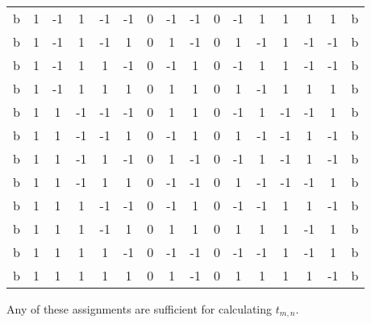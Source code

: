 \documentclass[12pt]{article}
\theoremstyle{plain}
\theoremstyle{definition}
\theoremstyle{remark}
\theoremstyle{definition}
\begin{document}
\begin{center}
\begin{tabular}{|c|c|c|c|c|c|c|c|c|c|c|c|c|c|c|c|}
b & 1 & -1 & 1 & -1 & -1 & 0 & -1 & -1 & 0 & -1 & 1 & 1 & 1 & 1 & b \\
b & 1 & -1 & 1 & -1 & 1 & 0 & 1 & -1 & 0 & 1 & -1 & 1 & -1 & -1 & b \\
b & 1 & -1 & 1 & 1 & -1 & 0 & -1 & 1 & 0 & -1 & 1 & 1 & -1 & -1 & b \\
b & 1 & -1 & 1 & 1 & 1 & 0 & 1 & 1 & 0 & 1 & -1 & 1 & 1 & 1 & b \\
b & 1 & 1 & -1 & -1 & -1 & 0 & 1 & 1 & 0 & -1 & 1 & -1 & -1 & 1 & b \\
b & 1 & 1 & -1 & -1 & 1 & 0 & -1 & 1 & 0 & 1 & -1 & -1 & 1 & -1 & b \\
b & 1 & 1 & -1 & 1 & -1 & 0 & 1 & -1 & 0 & -1 & 1 & -1 & 1 & -1 & b \\
b & 1 & 1 & -1 & 1 & 1 & 0 & -1 & -1 & 0 & 1 & -1 & -1 & -1 & 1 & b \\
b & 1 & 1 & 1 & -1 & -1 & 0 & -1 & 1 & 0 & -1 & -1 & 1 & 1 & -1 & b \\
b & 1 & 1 & 1 & -1 & 1 & 0 & 1 & 1 & 0 & 1 & 1 & 1 & -1 & 1 & b \\
b & 1 & 1 & 1 & 1 & -1 & 0 & -1 & -1 & 0 & -1 & -1 & 1 & -1 & 1 & b \\
b & 1 & 1 & 1 & 1 & 1 & 0 & 1 & -1 & 0 & 1 & 1 & 1 & 1 & -1 & b \\
\hline
\end{tabular}
\end{center}

Any of these assignments are sufficient for calculating $t_{m,n}$. 
\end{document}
